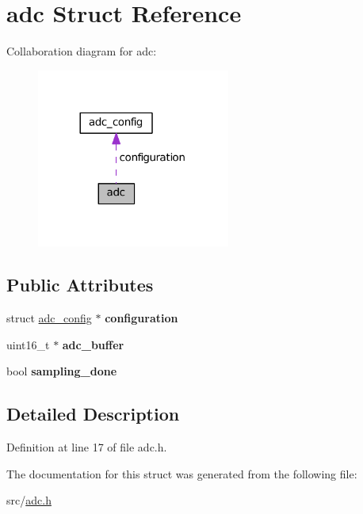 \hypertarget{structadc}{}\section{adc Struct Reference}
\label{structadc}


Collaboration diagram for adc\+:\nopagebreak
\begin{figure}[H]
\begin{center}
\leavevmode
\includegraphics[width=180pt]{structadc__coll__graph}
\end{center}
\end{figure}
\subsection*{Public Attributes}
\begin{DoxyCompactItemize}
\item 
\hypertarget{structadc_aaecb8053d6389a045fd2fd05b3b2f584}{}struct \hyperlink{structadc__config}{adc\+\_\+config} $\ast$ {\bfseries configuration}\label{structadc_aaecb8053d6389a045fd2fd05b3b2f584}

\item 
\hypertarget{structadc_a18f6e4c34b612060add403c39b12c44a}{}uint16\+\_\+t $\ast$ {\bfseries adc\+\_\+buffer}\label{structadc_a18f6e4c34b612060add403c39b12c44a}

\item 
\hypertarget{structadc_a83e9b544b8780ab70e5c193a4b5d8ef8}{}bool {\bfseries sampling\+\_\+done}\label{structadc_a83e9b544b8780ab70e5c193a4b5d8ef8}

\end{DoxyCompactItemize}


\subsection{Detailed Description}


Definition at line 17 of file adc.\+h.



The documentation for this struct was generated from the following file\+:\begin{DoxyCompactItemize}
\item 
src/\hyperlink{adc_8h}{adc.\+h}\end{DoxyCompactItemize}
